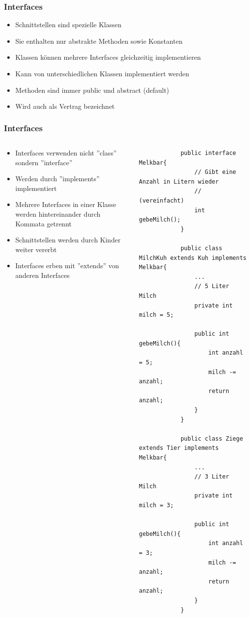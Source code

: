 \begin{frame}[fragile]
	\frametitle{Interfaces}
		\begin{itemize}
		  \item Schnittstellen sind spezielle Klassen
		  \item Sie enthalten nur abstrakte Methoden sowie Konstanten
		  \item Klassen k\"onnen mehrere Interfaces gleichzeitig
		  implementieren
		  \item Kann von unterschiedlichen Klassen implementiert werden
		  \item Methoden sind immer public und abstract (default)
		  \item Wird auch als Vertrag bezeichnet
		\end{itemize}
\end{frame}

\begin{frame}[fragile]
	\frametitle{Interfaces}
	\begin{columns}
	\begin{column}{0.5\textwidth}
		\small
		\begin{itemize}
		  \item Interfaces verwenden nicht ''class'' sondern
		  ''interface''
		  \item Werden durch ''implements'' implementiert
		  \item Mehrere Interfaces in einer Klasse werden
	 	 hintereinander durch Kommata getrennt
	 	 \item Schnittstellen werden durch Kinder weiter vererbt
	 	 \item Interfaces erben mit ''extends''
	 	 von anderen Interfaces
		\end{itemize}
	\end{column}
	\begin{column}{0.5\textwidth}
		\begin{lstlisting}
			public interface Melkbar{
				// Gibt eine Anzahl in Litern wieder
				// (vereinfacht)
				int gebeMilch();
			}
			
			public class MilchKuh extends Kuh implements Melkbar{
				...
				// 5 Liter Milch
				private int milch = 5;
				
				public int gebeMilch(){
					int anzahl = 5;
					milch -= anzahl;
					return anzahl;
				}
			}
			
			public class Ziege extends Tier implements Melkbar{
				...
				// 3 Liter Milch
				private int milch = 3;
				
				public int gebeMilch(){
					int anzahl = 3;
					milch -= anzahl;
					return anzahl;
				}
			}
		\end{lstlisting}
	\end{column}
	\end{columns}
\end{frame}

